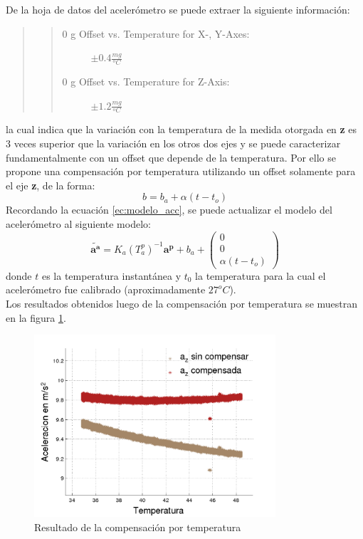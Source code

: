 \documentclass[main]{subfiles}
\begin{document}
De la hoja de datos del acelerómetro se puede extraer la siguiente información:
\begin{quote}
\begin{quote}
\begin{description}
\item [0 g Offset vs. Temperature for X-, Y-Axes:]$\pm 0.4\frac{mg}{^oC}$
\item [0 g Offset vs. Temperature for Z-Axis:]$\pm 1.2\frac{mg}{^oC}$
\end{description}
\end{quote}
\end{quote}
la cual indica que la variación con la temperatura de la medida otorgada en \textbf{z} es 3 veces superior que la variación en los otros dos ejes y se puede caracterizar fundamentalmente con un offset que depende de la temperatura. Por ello se propone una compensación por temperatura utilizando un offset solamente para el eje \textbf{z}, de la forma:
$$ b = b_a + \alpha (t - t_o) $$
Recordando la ecuación \ref{ec:modelo_acc}, se puede actualizar el modelo del acelerómetro al siguiente modelo:
\begin{equation}
\tilde{\mathbf{a^a}}=K_a(T_a^p)^{-1}\mathbf{a^p}+b_a+\left(
\begin{array}{c}
0 \\ 0 \\ \alpha(t - t_o)
\end{array}
\right)
\end{equation}
donde $t$ es la temperatura instantánea y $t_0$ la temperatura para la cual el acelerómetro fue calibrado (aproximadamente $27^oC$).\\

Los resultados obtenidos luego de la compensación por temperatura se muestran en la figura \ref{fig:resultado_temp}.

\begin{figure}[H]
  \begin{center}
    \includegraphics[width=0.8\textwidth]{./pics_acc/resultado_temp.pdf}
  \end{center}
  \vspace{-20pt}
  \caption{Resultado de la compensación por temperatura}
  \label{fig:resultado_temp}
\end{figure}
\end{document}

